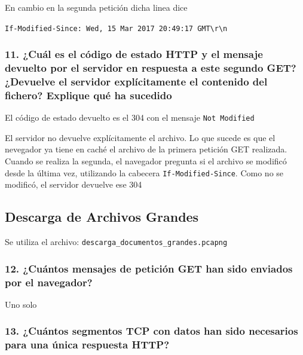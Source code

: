 \documentclass[11pt]{article}
\begin{document}
En cambio en la segunda petición dicha linea dice

\texttt{If-Modified-Since:\ Wed,\ 15\ Mar\ 2017\ 20:49:17\ GMT\textbackslash{}r\textbackslash{}n}

\hypertarget{cuuxe1l-es-el-cuxf3digo-de-estado-http-y-el-mensaje-devuelto-por-el-servidor-en-respuesta-a-este-segundo-get-devuelve-el-servidor-expluxedcitamente-el-contenido-del-fichero-explique-quuxe9-ha-sucedido}{%
\subsubsection{11. ¿Cuál es el código de estado HTTP y el mensaje
devuelto por el servidor en respuesta a este segundo GET? ¿Devuelve el
servidor explícitamente el contenido del fichero? Explique qué ha
sucedido}\label{cuuxe1l-es-el-cuxf3digo-de-estado-http-y-el-mensaje-devuelto-por-el-servidor-en-respuesta-a-este-segundo-get-devuelve-el-servidor-expluxedcitamente-el-contenido-del-fichero-explique-quuxe9-ha-sucedido}}

El código de estado devuelto es el 304 con el mensaje
\texttt{Not\ Modified}

El servidor no devuelve explícitamente el archivo. Lo que sucede es que
el nevegador ya tiene en caché el archivo de la primera petición GET
realizada. Cuando se realiza la segunda, el navegador pregunta si el
archivo se modificó desde la última vez, utilizando la cabecera
\texttt{If-Modified-Since}. Como no se modificó, el servidor devuelve
ese 304

    \hypertarget{descarga-de-archivos-grandes}{%
\subsection{Descarga de Archivos
Grandes}\label{descarga-de-archivos-grandes}}

    Se utiliza el archivo: \texttt{descarga\_documentos\_grandes.pcapng}

    \hypertarget{cuuxe1ntos-mensajes-de-peticiuxf3n-get-han-sido-enviados-por-el-navegador}{%
\subsubsection{12. ¿Cuántos mensajes de petición GET han sido enviados
por el
navegador?}\label{cuuxe1ntos-mensajes-de-peticiuxf3n-get-han-sido-enviados-por-el-navegador}}

Uno solo

\hypertarget{cuuxe1ntos-segmentos-tcp-con-datos-han-sido-necesarios-para-una-uxfanica-respuesta-http}{%
\subsubsection{13. ¿Cuántos segmentos TCP con datos han sido necesarios
para una única respuesta
HTTP?}\label{cuuxe1ntos-segmentos-tcp-con-datos-han-sido-necesarios-para-una-uxfanica-respuesta-http}}
\end{document}
